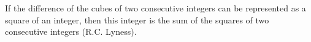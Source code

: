 If the difference of the cubes of two consecutive integers can be represented as a square of an integer, then this integer is the sum of the squares of two consecutive integers (R.C. Lyness).
